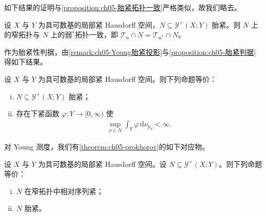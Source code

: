 \documentclass[../../main.tex]{subfiles}%
\begin{document}
如下结果的证明与\cref{proposition:ch05-胎紧拓扑一致}严格类似，故我们略去。

\begin{proposition}\label{proposition:ch05-Young胎紧一致}\label{proposition:ch05-矩估计}
设 $X$ 与 $Y$ 为具可数基的局部紧 Hausdorff 空间，$N\subseteq\mathcal{Y}^+(X;Y)$ 胎紧。则 $N$ 上的窄拓扑与 $N$ 上的弱$^*$拓扑一致，即 $\mathcal{T}_n\cap N=\mathcal{T}_{w^*}\cap N$。
\end{proposition}

作为胎紧性判据，由\cref{remark:ch05-Young胎紧投影}与\cref{proposition:ch05-胎紧判据}得如下结果。

\begin{proposition}\label{proposition:ch05-Young胎紧判据}
设 $X$ 与 $Y$ 为具可数基的局部紧 Hausdorff 空间。则下列命题等价：
\begin{enumerate}[(i)]
\item\label{item:ch05-ytight-i} $N\subseteq\mathcal{Y}^+(X;Y)$ 胎紧；
\item\label{item:ch05-ytight-ii} 存在下紧函数 $\varphi:Y\to[0,\infty)$ 使
\begin{align}
\sup_{\nu\in N}\int_Y\varphi\,\mathrm{d}\nu_{p_Y}<\infty.\label{align:ch05-5.63}
\end{align}
\end{enumerate}
\end{proposition}

对 Young 测度，我们有\cref{theorem:ch05-prokhorov}的如下对应物。

\begin{theorem}\label{theorem:ch05-弱紧Young}\label{proposition:ch05-弱紧YoungL1}
设 $X$ 与 $Y$ 为具可数基的局部紧 Hausdorff 空间。设 $N\subseteq\mathcal{Y}^+(X;Y)$。则下列命题等价：
\begin{enumerate}[(i)]
\item\label{item:ch05-youngcomp-i} $N$ 在窄拓扑中相对序列紧；
\item\label{item:ch05-youngcomp-ii} $N$ 胎紧。
\end{enumerate}
\end{theorem}
\end{document}
